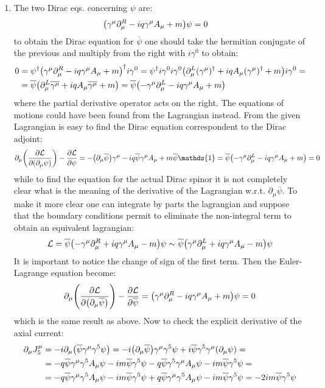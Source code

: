\documentclass[11pt, oneside]{article}   	%
\begin{document}
\begin{enumerate}[label=\alph*)]
\item The two Dirac eqs. concerning $\psi$ are:
\begin{align*}
	\qty(\gamma^\mu \partial_\mu^R - i q \gamma^\mu A_\mu + m)\psi &= 0 
\end{align*}
to obtain the Dirac equation for $\overline{\psi}$ one should take the hermitian conjugate of the previous and multiply from the right with $i\gamma^0$ to obtain:
\begin{align*}
	0&=\psi^\dagger \qty(\gamma^\mu \partial_\mu^R - i q \gamma^\mu A_\mu + m)^\dagger i\gamma^0 = \psi^\dagger i \gamma^0 i\gamma^0 \qty(\partial_\mu^L (\gamma^\mu)^\dagger + i q A_\mu (\gamma^\mu)^\dagger  + m) i\gamma^0 = \\
	&= \overline{\psi} \qty( \partial_\mu^L \overline{\gamma^\mu}  + iq A_\mu \overline{\gamma^\mu} + m) = \overline{\psi} \qty( - \gamma^\mu \partial_\mu^L - iq\gamma^\mu A_\mu + m)
\end{align*}
where the partial derivative operator acts on the right.
The equations of motions could have been found from the Lagrangian instead. From the given Lagrangian is easy to find the Dirac equation correspondent to the Dirac adjoint:
\[
	\partial_\mu \qty(\pdv{\mathcal{L}}{\qty(\partial_\mu \psi)} ) - \pdv{\mathcal{L}}{\psi} = -\qty(\partial_\mu \overline{\psi} ) \gamma^\mu - iq \overline{\psi} \gamma^\mu A_\mu + m \overline{\psi} \mathds{1} = \overline{\psi} \qty( - \gamma^\mu \partial_\mu^L - iq\gamma^\mu A_\mu + m) = 0 
\]
while to find the equation for the actual Dirac spinor it is not completely clear what is the meaning of the derivative of the Lagrangian w.r.t. $\partial_\mu\overline{\psi}$. To make it more clear one can integrate by parts the lagrangian and suppose that the boundary conditions permit to eliminate the non-integral term to obtain an equivalent lagrangian:
\[
	\mathcal{L} = \overline{\psi} \qty( -\gamma^\mu \partial_\mu^R + i q\gamma^\mu A_\mu -m ) \psi \sim \overline{\psi} \qty( \gamma^\mu \partial_\mu^L + i q\gamma^\mu A_\mu -m ) \psi
\]
It is important to notice the change of sign of the first term. Then the Euler-Lagrange equation become:
\[
	\partial_\mu \qty(\pdv{\mathcal{L}}{\qty(\partial_\mu \overline{\psi})} ) - \pdv{\mathcal{L}}{\overline{\psi}} = \qty(\gamma^\mu \partial_\mu^R - iq\gamma^\mu A_\mu + m)\psi = 0
\]
which is the same result as above.
Now to check the explicit derivative of the axial current:
\begin{align*}
	\partial_\mu J^\mu_5 &= -i \partial_\mu \qty( \overline{\psi} \gamma^\mu \gamma^5 \psi ) = -i \qty( \partial_\mu \overline{\psi}) \gamma^\mu \gamma^5 \psi + i \overline{\psi} \gamma^5 \gamma^\mu \qty( \partial_\mu \psi) = \\
	&= -q \overline{\psi} \gamma^\mu \gamma^5 A_\mu \psi - im\overline{\psi} \gamma^5 \psi -q \overline{\psi} \gamma^5 \gamma^\mu A_\mu \psi - im\overline{\psi} \gamma^5 \psi = \\
	&= -q \overline{\psi} \gamma^\mu \gamma^5 A_\mu \psi - im\overline{\psi} \gamma^5 \psi +q \overline{\psi} \gamma^\mu \gamma^5 A_\mu \psi - im\overline{\psi} \gamma^5 \psi = -2im \overline{\psi} \gamma^5 \psi
\end{align*}



\end{enumerate}
\end{document}
